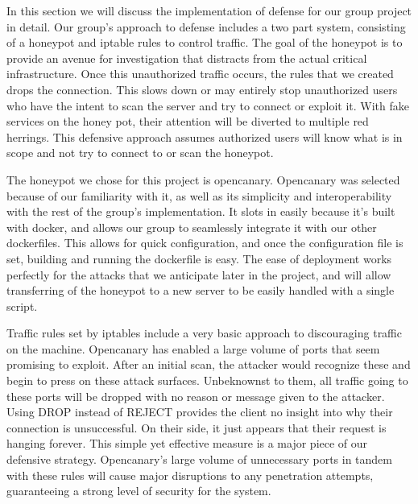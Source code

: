 In this section we will discuss the implementation of defense for our group project in detail. Our group's approach to defense includes a two part system, consisting of a honeypot and iptable rules to control traffic. The goal of the honeypot is to provide an avenue for investigation that distracts from the actual critical infrastructure. Once this unauthorized traffic occurs, the rules that we created drops the connection. This slows down or may entirely stop unauthorized users who have the intent to scan the server and try to connect or exploit it. With fake services on the honey pot, their attention will be diverted to multiple red herrings. This defensive approach assumes authorized users will know what is in scope and not try to connect to or scan the honeypot.

The honeypot we chose for this project is opencanary. Opencanary was selected because of our  familiarity with it, as well as its simplicity and interoperability with the rest of the group's implementation. It slots in easily because it’s built with docker, and allows our group to seamlessly integrate it with our other dockerfiles. This allows for quick configuration, and once the configuration file is set, building and running the dockerfile is easy. The ease of deployment works perfectly for the attacks that we anticipate later in the project, and will allow transferring of the honeypot to a new server to be easily handled with a single script. 

Traffic rules set by iptables include a very basic approach to discouraging traffic on the machine. Opencanary has enabled a large volume of ports that seem promising to exploit. After an initial scan, the attacker would recognize these and begin to press on these attack surfaces. Unbeknownst to them, all traffic going to these ports will be dropped with no reason or message given to the attacker. Using DROP instead of REJECT provides the client no insight into why their connection is unsuccessful. On their side, it just appears that their request is hanging forever. This simple yet effective measure is a major piece of our defensive strategy. Opencanary’s large volume of unnecessary ports in tandem with these rules will cause major disruptions to any penetration attempts, guaranteeing a strong level of security for the system. 


